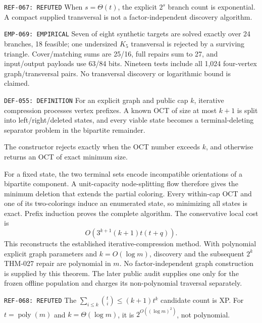 \documentclass[11pt]{article}
\begin{document}
{\texttt{REF-067: REFUTED}}
When \(s=\Theta(t)\), the explicit \(2^s\) branch count is exponential.
A compact supplied transversal is not a factor-independent discovery
algorithm.

{\texttt{EMP-069: EMPIRICAL}}
Seven of eight synthetic targets are solved exactly over 24 branches, 18
feasible; one undersized \(K_5\) transversal is rejected by a surviving
triangle.  Cover/matching sums are 25/16, full repairs sum to 27, and
input/output payloads use 63/84 bits.  Nineteen tests include all 1,024
four-vertex graph/transversal pairs.  No transversal discovery or
logarithmic bound is claimed.

{\texttt{DEF-055: DEFINITION}}
For an explicit graph and public cap \(k\), iterative compression processes
vertex prefixes.  A known OCT of size at most \(k+1\) is split into
left/right/deleted states, and every viable state becomes a
terminal-deleting separator problem in the bipartite remainder.

{}
The constructor rejects exactly when the OCT number exceeds \(k\), and
otherwise returns an OCT of exact minimum size.
\begin{claimproof}
For a fixed state, the two terminal sets encode incompatible orientations of
a bipartite component.  A unit-capacity node-splitting flow therefore gives
the minimum deletion that extends the partial coloring.  Every within-cap
OCT and one of its two-colorings induce an enumerated state, so minimizing
all states is exact.  Prefix induction proves the complete algorithm.
The conservative local cost is
\[
 O\!\left(3^{k+1}(k+1)t(t+q)\right).
\]
This reconstructs the established iterative-compression method.  With
polynomial explicit graph parameters and \(k=O(\log m)\), discovery and the
subsequent \(2^k\) THM-027 repair are
polynomial in \(m\).  No factor-independent graph construction is supplied
by this theorem.  The later public audit supplies one only for the frozen
offline population and charges its non-polynomial traversal separately.
\end{claimproof}

{\texttt{REF-068: REFUTED}}
The \(\sum_{i\le k}\binom{t}{i}\le(k+1)t^k\) candidate count is XP.  For
\(t=\operatorname{poly}(m)\) and \(k=\Theta(\log m)\), it is
\(2^{O((\log m)^2)}\), not polynomial.
\end{document}
